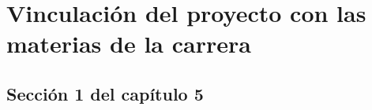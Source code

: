 
\chapter{Vinculación del proyecto con las materias de la carrera} %

\label{Chapter5} %



\section{Sección 1 del capítulo 5}